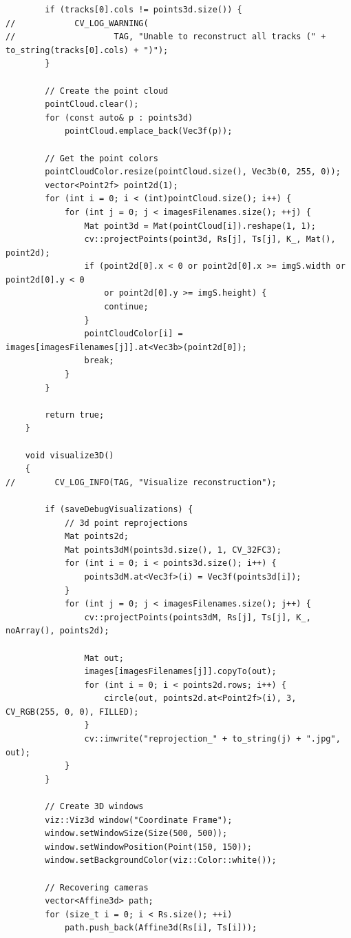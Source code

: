 \documentclass[a4paper, 12pt]{article}
\begin{document}
\begin{lstlisting}
        if (tracks[0].cols != points3d.size()) {
//            CV_LOG_WARNING(
//                    TAG, "Unable to reconstruct all tracks (" + to_string(tracks[0].cols) + ")");
        }

        // Create the point cloud
        pointCloud.clear();
        for (const auto& p : points3d)
            pointCloud.emplace_back(Vec3f(p));

        // Get the point colors
        pointCloudColor.resize(pointCloud.size(), Vec3b(0, 255, 0));
        vector<Point2f> point2d(1);
        for (int i = 0; i < (int)pointCloud.size(); i++) {
            for (int j = 0; j < imagesFilenames.size(); ++j) {
                Mat point3d = Mat(pointCloud[i]).reshape(1, 1);
                cv::projectPoints(point3d, Rs[j], Ts[j], K_, Mat(), point2d);
                if (point2d[0].x < 0 or point2d[0].x >= imgS.width or point2d[0].y < 0
                    or point2d[0].y >= imgS.height) {
                    continue;
                }
                pointCloudColor[i] = images[imagesFilenames[j]].at<Vec3b>(point2d[0]);
                break;
            }
        }

        return true;
    }

    void visualize3D()
    {
//        CV_LOG_INFO(TAG, "Visualize reconstruction");

        if (saveDebugVisualizations) {
            // 3d point reprojections
            Mat points2d;
            Mat points3dM(points3d.size(), 1, CV_32FC3);
            for (int i = 0; i < points3d.size(); i++) {
                points3dM.at<Vec3f>(i) = Vec3f(points3d[i]);
            }
            for (int j = 0; j < imagesFilenames.size(); j++) {
                cv::projectPoints(points3dM, Rs[j], Ts[j], K_, noArray(), points2d);

                Mat out;
                images[imagesFilenames[j]].copyTo(out);
                for (int i = 0; i < points2d.rows; i++) {
                    circle(out, points2d.at<Point2f>(i), 3, CV_RGB(255, 0, 0), FILLED);
                }
                cv::imwrite("reprojection_" + to_string(j) + ".jpg", out);
            }
        }

        // Create 3D windows
        viz::Viz3d window("Coordinate Frame");
        window.setWindowSize(Size(500, 500));
        window.setWindowPosition(Point(150, 150));
        window.setBackgroundColor(viz::Color::white());

        // Recovering cameras
        vector<Affine3d> path;
        for (size_t i = 0; i < Rs.size(); ++i)
            path.push_back(Affine3d(Rs[i], Ts[i]));


\end{lstlisting}
\end{document}
